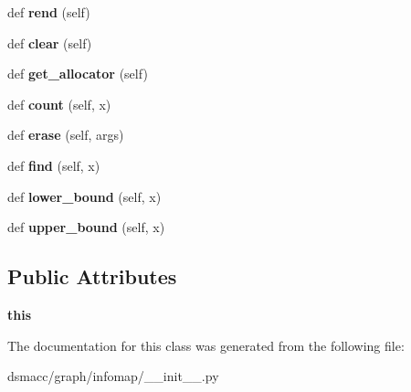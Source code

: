 \begin{DoxyCompactItemize}
def {\bfseries rend} (self)
\item 
\mbox{\label{classdsmacc_1_1graph_1_1infomap_1_1StateNodeMap_a9f1d77a2c1d7422ee6feb52493be8a18}} 
def {\bfseries clear} (self)
\item 
\mbox{\label{classdsmacc_1_1graph_1_1infomap_1_1StateNodeMap_a750fb8773639f39f5cf1cd29884b52ca}} 
def {\bfseries get\+\_\+allocator} (self)
\item 
\mbox{\label{classdsmacc_1_1graph_1_1infomap_1_1StateNodeMap_a7de90679ffcd6b50af2a86b3e255778b}} 
def {\bfseries count} (self, x)
\item 
\mbox{\label{classdsmacc_1_1graph_1_1infomap_1_1StateNodeMap_afd59ba7ef3b5243971a7d83f75a673df}} 
def {\bfseries erase} (self, args)
\item 
\mbox{\label{classdsmacc_1_1graph_1_1infomap_1_1StateNodeMap_a79a93046479d46bc8b34d683b9d0dfad}} 
def {\bfseries find} (self, x)
\item 
\mbox{\label{classdsmacc_1_1graph_1_1infomap_1_1StateNodeMap_a59044437ace5b3c6e19a8043d956c0fb}} 
def {\bfseries lower\+\_\+bound} (self, x)
\item 
\mbox{\label{classdsmacc_1_1graph_1_1infomap_1_1StateNodeMap_a3a9e3b7d0c906d229557729a53e6a1a5}} 
def {\bfseries upper\+\_\+bound} (self, x)
\end{DoxyCompactItemize}
\subsection*{Public Attributes}
\begin{DoxyCompactItemize}
\item 
\mbox{\label{classdsmacc_1_1graph_1_1infomap_1_1StateNodeMap_add1a0d16b44e30a5ebac01207fd6e0c0}} 
{\bfseries this}
\end{DoxyCompactItemize}


The documentation for this class was generated from the following file\+:\begin{DoxyCompactItemize}
\item 
dsmacc/graph/infomap/\+\_\+\+\_\+init\+\_\+\+\_\+.\+py\end{DoxyCompactItemize}
